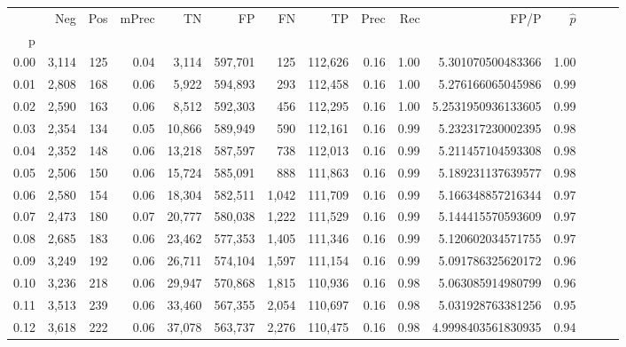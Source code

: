 \begin{tabular}{rrrrrrrrrrrrrrr}
\toprule
{} &     Neg &    Pos & mPrec &       TN &       FP &       FN &       TP &  Prec &   Rec &                  FP/P & $\hat{p}$ \\
p    &         &        &       &          &          &          &          &       &       &                       &           \\
\midrule
0.00 &   3,114 &    125 &  0.04 &    3,114 &  597,701 &      125 &  112,626 &  0.16 &  1.00 &     5.301070500483366 &      1.00 \\
0.01 &   2,808 &    168 &  0.06 &    5,922 &  594,893 &      293 &  112,458 &  0.16 &  1.00 &     5.276166065045986 &      0.99 \\
0.02 &   2,590 &    163 &  0.06 &    8,512 &  592,303 &      456 &  112,295 &  0.16 &  1.00 &    5.2531950936133605 &      0.99 \\
0.03 &   2,354 &    134 &  0.05 &   10,866 &  589,949 &      590 &  112,161 &  0.16 &  0.99 &     5.232317230002395 &      0.98 \\
0.04 &   2,352 &    148 &  0.06 &   13,218 &  587,597 &      738 &  112,013 &  0.16 &  0.99 &     5.211457104593308 &      0.98 \\
0.05 &   2,506 &    150 &  0.06 &   15,724 &  585,091 &      888 &  111,863 &  0.16 &  0.99 &     5.189231137639577 &      0.98 \\
0.06 &   2,580 &    154 &  0.06 &   18,304 &  582,511 &    1,042 &  111,709 &  0.16 &  0.99 &     5.166348857216344 &      0.97 \\
0.07 &   2,473 &    180 &  0.07 &   20,777 &  580,038 &    1,222 &  111,529 &  0.16 &  0.99 &     5.144415570593609 &      0.97 \\
0.08 &   2,685 &    183 &  0.06 &   23,462 &  577,353 &    1,405 &  111,346 &  0.16 &  0.99 &     5.120602034571755 &      0.97 \\
0.09 &   3,249 &    192 &  0.06 &   26,711 &  574,104 &    1,597 &  111,154 &  0.16 &  0.99 &     5.091786325620172 &      0.96 \\
0.10 &   3,236 &    218 &  0.06 &   29,947 &  570,868 &    1,815 &  110,936 &  0.16 &  0.98 &     5.063085914980799 &      0.96 \\
0.11 &   3,513 &    239 &  0.06 &   33,460 &  567,355 &    2,054 &  110,697 &  0.16 &  0.98 &     5.031928763381256 &      0.95 \\
0.12 &   3,618 &    222 &  0.06 &   37,078 &  563,737 &    2,276 &  110,475 &  0.16 &  0.98 &    4.9998403561830935 &      0.94 \\

\end{tabular}
